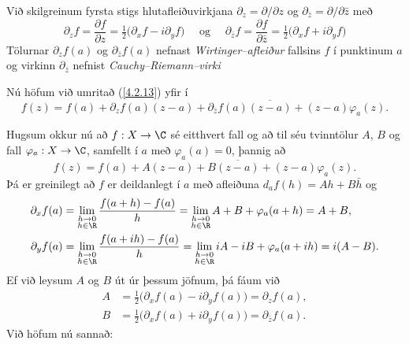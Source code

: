 \begin{sk}  Við skilgreinum fyrsta stigs hlutafleiðuvirkjana
${\partial}_z={\partial}/{\partial}z$ og 
${\partial}_{\bar z}={\partial}/{\partial}\bar z$ með
\begin{equation*}
{\partial}_zf=\dfrac{{\partial}f}{{\partial} z}
=\tfrac 12\big({\partial}_xf-i{\partial}_yf\big) \quad \text{ og } \quad
{\partial}_{\bar z}f=\dfrac{{\partial}f}{{\partial}\bar z}
=\tfrac 12\big({\partial}_xf+i{\partial}_yf\big)
\label{4.2.14}
\end{equation*}
Tölurnar ${\partial}_zf(a)$ og ${\partial}_{\bar z}f(a)$ nefnast
{\it Wirtinger--afleiður} fallsins $f$ í punktinum $a$ og virkinn
${\partial}_{\bar z}$ nefnist {\it
Cauchy--Riemann--virki}
\end{sk}

Nú höfum við umritað (\ref{4.2.13}) yfir í
\begin{equation}
f(z)=f(a)+{\partial}_zf(a)(z-a)+{\partial}_{\bar z}f(a)\overline{(z-a)}
+ (z-a)\varphi_a(z).
\label{4.2.15}
\end{equation}



Hugsum okkur nú að $f:X\to \C$ sé eitthvert fall og að til séu
tvinntölur $A$, $B$ og fall $\varphi_a:X\to \C$, samfellt í $a$ með
$\varphi_a(a)=0$, þannig að
\begin{equation}
f(z)=f(a)+A(z-a)+B\overline{(z-a)}+(z-a)\varphi_a(z).
\label{4.2.16}
\end{equation} 
Þá er greinilegt að $f$ er deildanlegt í $a$ með afleiðuna
$d_af(h)=Ah+B\bar h$ og
\begin{align*}
{\partial}_xf(a) &=
\lim_{\substack{ h\to 0\\ h\in \R}} \dfrac{f(a+h)-f(a)}h
=\lim_{\substack{ h\to 0\\ h\in \R}} A+B+\varphi_a(a+h) = A+B,\\
{\partial}_yf(a) &=
\lim_{\substack{ h\to 0\\ h\in \R}} \dfrac{f(a+ih)-f(a)}h
=\lim_{\substack{ h\to 0\\ h\in \R}} iA-iB+\varphi_a(a+ih) = i(A-B).
\end{align*}
Ef við leysum $A$ og $B$ út úr þessum jöfnum, þá fáum við
\begin{align*}
A&= \tfrac 12\big({\partial}_xf(a)-i{\partial}_yf(a)\big)
={\partial}_zf(a),\\
B&= \tfrac 12\big({\partial}_xf(a)+i{\partial}_yf(a)\big)
={\partial}_{\bar z}f(a).
\end{align*}
Við höfum nú sannað:

